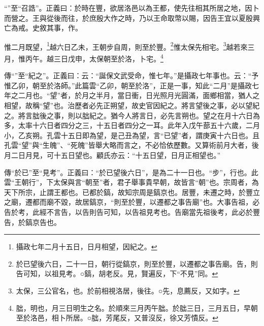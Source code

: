 {\noindent\shu{}\fzkt “”至“召誥”。正義曰：於時在豐，欲居洛邑以為王都，使先往相其所居之地，因卜而營之。王與從後而往，於庶殷大作之時，乃以王命取幣以賜，因告王宜以夏殷興亡為戒。史敘其事，作。 \par}

惟二月既望，\footnote{攝政七年二月十五日，日月相望，因紀之。}越六日乙未，王朝步自周，則至於豐。\footnote{於已望後六日，二十一日，朝行從鎬京，則至於豐，以遷都之事告廟。告，則告可知，以祖見考。○鎬，胡老反。見，賢遍反，下“不見”同。}惟太保先相宅。\footnote{太保，三公官名，也。於前相視洛居，後往。○先，息薦反，又如字。}越若來三月，惟丙午。越三日戊申，太保朝至於洛，卜宅。\footnote{朏，明也，月三日明生之名。於順來三月丙午朏。於朏三日，三月五日，早朝至於洛邑，相卜所居。○朏，芳尾反，又普沒反，徐又芳憒反。}


{\noindent\zhuan{}\fzbyks 傳“”至“紀之”。正義曰：云：“誕保文武受命，惟七年。”是攝政七年事也。云：“予惟乙卯，朝至於洛師。”此篇雲“乙卯，朝至於洛”，正是一事，知此“二月”是攝政七年之二月也。“望”者，於月之半月，當日衝，日光照月光圓滿，面鄉相當，猶人之相望，故稱“望”也。治歷者必先正朔望，故史官因紀之。將言望後之事，必以望紀之。將言朏後之事，則以朏紀之。猶今人將言日，必先言朔也。望之在月十六日為多，太率十六日者四分之三，十五日者四分之一耳。此年入戊午蔀五十六歲，二月小，乙亥朔。孔雲十五日即為望，是己丑為望，言“已望”者，謂庚寅十六日也。且孔雲“望”與“生魄”、“死魄”皆舉大略而言之，不必恰依歷數。又算術前月大者，後月二日月見，可十五日望也。顧氏亦云：“十五日望，日月正相望也。” \par}

{\noindent\zhuan{}\fzbyks 傳“於已”至“見考”。正義曰：“於已望後六日”，是為二十一日也。“步”，行也。此雲“王朝行”，下太保與言“朝至”者，君子舉事貴早朝，故皆言“朝”也。宗周者，為天下所宗，止謂王都也。已都於鎬，故知宗周是鎬京也。居豐，未遷之時，於豐立之廟，遷都而廟不毀，故居鎬京，“則至於豐，以遷都之事告廟”也。大事告祖，必告於考，此經不言告，以告則告可知，以告祖見考也。告廟當先祖後考，此必於豐告，於鎬京告也。 \par}

